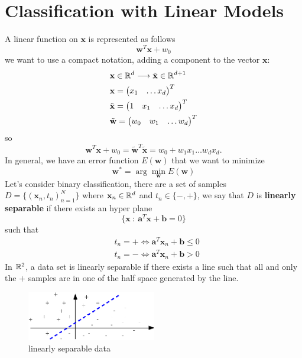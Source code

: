 \documentclass[10pt, letterpaper]{report}
\begin{document}
\section{Classification with Linear Models}
A linear function on $\mathbf x$ is represented as follows\begin{equation}
    \mathbf w^T\mathbf x+w_0
\end{equation}
we want to use a compact notation, adding a component to the vector $\mathbf x$:\begin{align}
    &\mathbf x \in {\mathbb R}^d\longrightarrow \tilde{\mathbf x}\in {\mathbb R}^{d+1}\\
    &\mathbf x=\begin{pmatrix}
        x_1&\dots x_d
    \end{pmatrix}^T\\
    &\tilde{\mathbf x}=\begin{pmatrix}
        1&x_1&\dots x_d
    \end{pmatrix}^T\\
    &\tilde{\mathbf w}=\begin{pmatrix}
        w_0&w_1&\dots w_d
    \end{pmatrix}^T
\end{align}
so\begin{equation}
    \mathbf w^T\mathbf x +w_0=\tilde{\mathbf w}^T\tilde{\mathbf x}=w_0+w_1x_1\dots w_dx_d.
\end{equation}
In general, we have an error function $E(\mathbf w)$ that we want to minimize\begin{equation}
    \mathbf w^*=\arg\min_{\mathbf w}E(\mathbf w)
\end{equation} 
Let's consider binary classification, there are a set of samples $D=\{(\mathbf x_n,t_n)_{n=1}^N\}$ where $\mathbf x_n\in {\mathbb R}^d$ and $t_n\in\{-,+\}$, we say that $D$ is \textbf{linearly separable} if there exists an hyper plane $$ \{\mathbf x \  : \ \mathbf a^T\mathbf x+\mathbf b= 0\}$$ such that\begin{align}
    &t_n=+\iff \mathbf a^T\mathbf x_n+\mathbf b\le 0\\ 
    &t_n=-\iff \mathbf a^T\mathbf x_n+\mathbf b> 0
\end{align}
In ${\mathbb R}^2$, a data set is linearly separable if there exists a line such that all and only the $+$ samples are in one of the half space generated by the line.\bigskip

\begin{figure}[h!]
    \centering
    \includegraphics[width=0.5\textwidth]{images/linsep.eps}
    \caption{linearly separable data}
    \label{img:linsep}
\end{figure}
\end{document}
